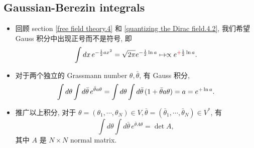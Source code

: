 \subsection{Gaussian-Berezin integrals}
\begin{itemize}
	\item 回顾 section \ref{free field theory.4} 和 \eqref{quantizing the Dirac field.4.2}, 我们希望 Gauss 积分中出现正号而不是符号, 即
	\begin{equation}
		\int dx \, e^{- \frac{1}{2} a x^2} = \sqrt{2 \pi} e^{- \frac{1}{2} \ln a} \mapsto \propto e^{\mathcolor{red}{+} \frac{1}{2} \ln a}.
	\end{equation}
	
	\item 对于两个独立的 Grassmann number $\theta, \bar{\theta}$, 有 Gauss 积分,
	\begin{equation}
		\int d\theta \int d\bar{\theta} \, e^{\bar{\theta} a \theta} = \int d\theta \int d\bar{\theta} \, (1 + \bar{\theta} a \theta) = a = e^{\mathcolor{red}{+} \ln a}.
	\end{equation}
	
	\item 推广以上积分, 对于 $\theta = (\theta_1, \cdots, \theta_N) \in V, \bar{\theta} = (\bar{\theta}_1, \cdots, \bar{\theta}_N) \in V^*$, 有
	\begin{equation}
		\int d\theta \int d\bar{\theta} \, e^{\bar{\theta} A \theta} = \det A,
	\end{equation}
	其中 $A$ 是 $N \times N$ normal matrix.
	

\end{itemize}
